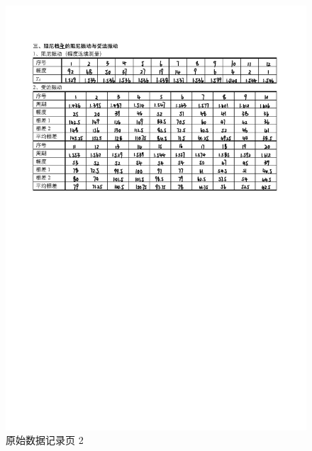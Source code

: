 \documentclass[12pt,a4paper]{amsart}
\begin{document}
\begin{figure}[h]
	\centering
	\includegraphics[width=1.0\textwidth]{img/original_data_page_2.jpg}
	\caption{原始数据记录页 2}
	\label{fig:original_data_page_2}
\end{figure}


{\footnotesize}
\end{document}
